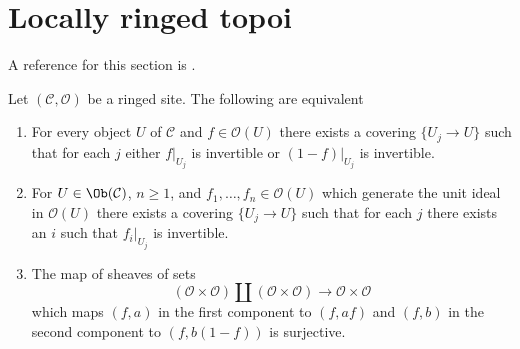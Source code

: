 \section{Locally ringed topoi}
\label{section-locally-ringed}


\noindent
A reference for this section is
\cite[Expos\'e IV, Exercice 13.9]{SGA4}.

\begin{lemma}
\label{lemma-locally-ringed}
Let $(\mathcal{C}, \mathcal{O})$ be a ringed site. The following
are equivalent
\begin{enumerate}
\item For every object $U$ of $\mathcal{C}$ and $f \in \mathcal{O}(U)$
there exists a covering $\{U_j \to U\}$ such that for each $j$
either $f|_{U_j}$ is invertible or $(1 - f)|_{U_j}$ is invertible.
\item For $U \in \Ob(\mathcal{C})$, $n \geq 1$, and
$f_1, \ldots, f_n \in \mathcal{O}(U)$ which generate the unit ideal
in $\mathcal{O}(U)$ there exists a covering $\{U_j \to U\}$
such that for each $j$ there exists an $i$ such that $f_i|_{U_j}$
is invertible.
\item The map of sheaves of sets
$$
(\mathcal{O} \times \mathcal{O})
\amalg
(\mathcal{O} \times \mathcal{O})
\longrightarrow
\mathcal{O} \times \mathcal{O}
$$
which maps $(f, a)$ in the first component to $(f, af)$ and
$(f, b)$ in the second component to $(f, b(1 - f))$ is surjective.
\end{enumerate}
\end{lemma}

